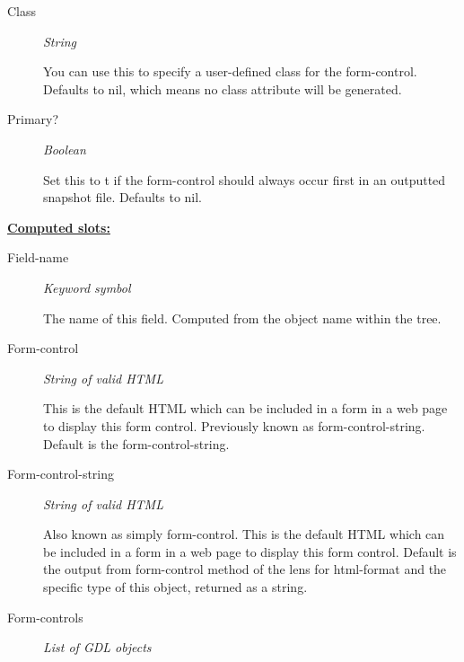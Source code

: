 \documentclass [11pt]{book}
\begin{document}
\begin{itemize}
\begin{description}

\item [Class]
\emph{String}

 You can use this to specify a user-defined class for the form-control. Defaults to nil, which means no class attribute will be generated.




\item [Primary?]
\emph{Boolean}

 Set this to t if the form-control should always occur first in an outputted snapshot file.
Defaults to nil.




\end{description}






\textbf{
\underline{Computed slots:}}

\begin{description}

\item [Field-name]
\emph{Keyword symbol}

 The name of this field. Computed from the object name within the tree.




\item [Form-control]
\emph{String of valid HTML}

 This is the default HTML which can be included in a form in a web page to display this form control.
Previously known as form-control-string. Default is the form-control-string.




\item [Form-control-string]
\emph{String of valid HTML}

 Also known as simply form-control.
This is the default HTML which can be included in a form in a web page to display this form control.
Default is the output from form-control method of the lens for html-format and the
specific type of this object, returned as a string.




\item [Form-controls]
\emph{List of GDL objects}


\end{description}
\end{itemize}
\end{document}
